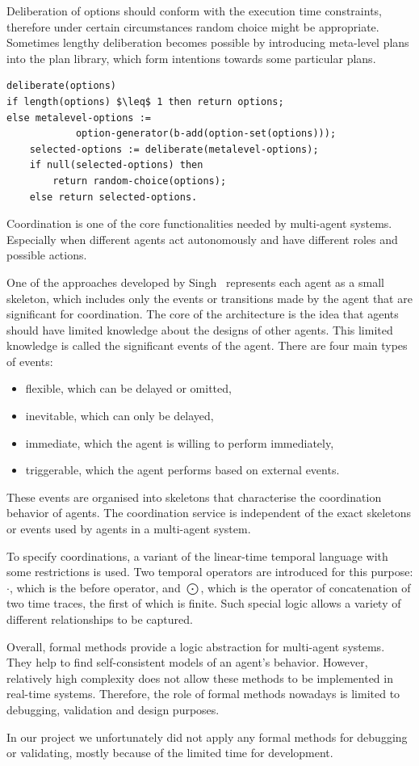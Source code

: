 Deliberation of options should conform with the execution time constraints, therefore under certain circumstances random choice might be appropriate.
Sometimes lengthy deliberation becomes possible by introducing meta-level plans into the plan library, which form intentions towards some particular plans.

\begin{lstlisting}[mathescape]
deliberate(options)
if length(options) $\leq$ 1 then return options;
else metalevel-options :=
            option-generator(b-add(option-set(options)));
    selected-options := deliberate(metalevel-options);
    if null(selected-options) then
        return random-choice(options);
    else return selected-options.
\end{lstlisting}

Coordination is one of the core functionalities needed by multi-agent systems.
Especially when different agents act autonomously and have different roles and possible actions.

One of the approaches developed by Singh~\cite{Singh_97} represents each agent as a small skeleton, which includes only the events or transitions made by the agent that are significant for coordination.
The core of the architecture is the idea that agents should have limited knowledge about the designs of other agents.
This limited knowledge is called the significant events of the agent.
There are four main types of events:
\begin{itemize}
  \item flexible, which can be delayed or omitted,
  \item inevitable, which can only be delayed,
  \item immediate, which the agent is willing to perform immediately,
  \item triggerable, which the agent performs based on external events.
\end{itemize}
These events are organised into skeletons that characterise the coordination behavior of agents.
The coordination service is independent of the exact skeletons or events used by agents in a multi-agent system.

To specify coordinations, a variant of the linear-time temporal language with some restrictions is used.
Two temporal operators are introduced for this purpose: $\cdot$, which is the before operator, and $\bigodot$, which is the operator of concatenation of two time traces, the first of which is finite.
Such special logic allows a variety of different relationships to be captured.

Overall, formal methods provide a logic abstraction for multi-agent systems.
They help to find self-consistent models of an agent's behavior.
However, relatively high complexity does not allow these methods to be implemented in real-time systems.
Therefore, the role of formal methods nowadays is limited to debugging, validation and design purposes.

In our project we unfortunately did not apply any formal methods for debugging or validating, mostly because of the limited time for development.
